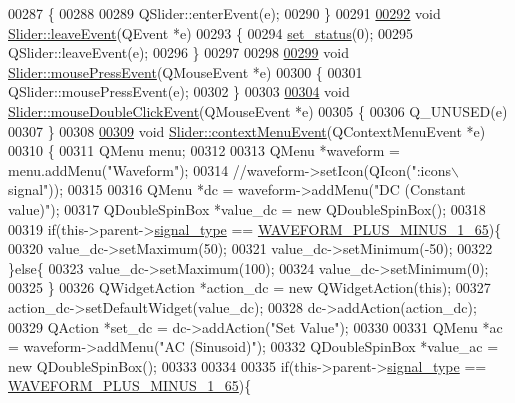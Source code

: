 \begin{DoxyCode}
00287 \{
00288 
00289     QSlider::enterEvent(e);
00290 \}
00291 
\hypertarget{a00046_source_l00292}{}\hyperlink{a00024_a40078aca597449b51938078628c695ae}{00292} \textcolor{keywordtype}{void} \hyperlink{a00024_a40078aca597449b51938078628c695ae}{Slider::leaveEvent}(QEvent *e)
00293 \{
00294     \hyperlink{a00024_a567902754e43310fe921b74c9d1862dd}{set\_status}(0);
00295     QSlider::leaveEvent(e);
00296 \}
00297 
00298 
\hypertarget{a00046_source_l00299}{}\hyperlink{a00024_a99f35b6c6aa1ffa696ac44e558bb3dab}{00299} \textcolor{keywordtype}{void} \hyperlink{a00024_a99f35b6c6aa1ffa696ac44e558bb3dab}{Slider::mousePressEvent}(QMouseEvent *e)
00300 \{
00301    QSlider::mousePressEvent(e);
00302 \}
00303 
\hypertarget{a00046_source_l00304}{}\hyperlink{a00024_a408a766481a987b9f165de7bd54a1a38}{00304} \textcolor{keywordtype}{void} \hyperlink{a00024_a408a766481a987b9f165de7bd54a1a38}{Slider::mouseDoubleClickEvent}(QMouseEvent *e)
00305 \{
00306     Q\_UNUSED(e)
00307 \}
00308 
\hypertarget{a00046_source_l00309}{}\hyperlink{a00024_ac5ddce14c487d6bc720035cf338e8021}{00309} \textcolor{keywordtype}{void} \hyperlink{a00024_ac5ddce14c487d6bc720035cf338e8021}{Slider::contextMenuEvent}(QContextMenuEvent *e)
00310 \{
00311     QMenu menu;
00312 
00313     QMenu   *waveform = menu.addMenu(\textcolor{stringliteral}{"Waveform"});
00314              \textcolor{comment}{//waveform->setIcon(QIcon(":icons\(\backslash\)signal"));}
00315 
00316     QMenu   *dc = waveform->addMenu(\textcolor{stringliteral}{"DC (Constant value)"});
00317     QDoubleSpinBox *value\_dc = \textcolor{keyword}{new} QDoubleSpinBox();
00318 
00319     \textcolor{keywordflow}{if}(this->parent->\hyperlink{a00004_a070edaec5aee6ba1f5a6866bc32c8ce4}{signal\_type} == \hyperlink{a00034_a0923d3b365a36e1e8c401cec964aa36f}{WAVEFORM\_PLUS\_MINUS\_1\_65})\{
00320     value\_dc->setMaximum(50);
00321     value\_dc->setMinimum(-50);
00322     \}\textcolor{keywordflow}{else}\{
00323     value\_dc->setMaximum(100);
00324     value\_dc->setMinimum(0);
00325     \}
00326     QWidgetAction *action\_dc = \textcolor{keyword}{new} QWidgetAction(\textcolor{keyword}{this});
00327     action\_dc->setDefaultWidget(value\_dc);
00328     dc->addAction(action\_dc);
00329     QAction *set\_dc = dc->addAction(\textcolor{stringliteral}{"Set Value"});
00330 
00331     QMenu   *ac = waveform->addMenu(\textcolor{stringliteral}{"AC (Sinusoid)"});
00332     QDoubleSpinBox *value\_ac = \textcolor{keyword}{new} QDoubleSpinBox();
00333 
00334 
00335     \textcolor{keywordflow}{if}(this->parent->\hyperlink{a00004_a070edaec5aee6ba1f5a6866bc32c8ce4}{signal\_type} == \hyperlink{a00034_a0923d3b365a36e1e8c401cec964aa36f}{WAVEFORM\_PLUS\_MINUS\_1\_65})\{

\end{DoxyCode}
